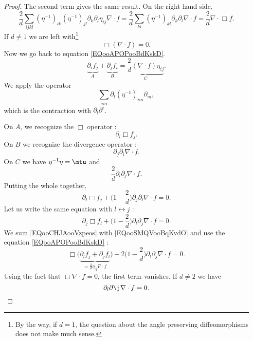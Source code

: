 \begin{proof}
    The second term gives the same result. On the right hand side,
    \begin{equation}
        \frac{ 2 }{ d }\sum_{ijkl}(\eta^{-1})_{ik}(\eta^{-1})_{jl}\partial_k\partial_l\eta_{ij}\nabla\cdot  f=\frac{ 2 }{ d }\sum_{kl}(\eta^{-1})_{kl}\partial_k\partial_l\nabla\cdot f=\frac{ 2 }{ d }\nabla\cdot\Box f.
    \end{equation}
    If \( d\neq 1\) we are left with\footnote{By the way, if \( d=1\), the question about the angle preserving diffeomorphisms does not make much sense.}
    \begin{equation}
        \Box(\nabla\cdot  f)=0.
    \end{equation}
    Now we go back to equation \eqref{EQooAPOPooBdKskD}.
    \begin{equation}
        \underbrace{\partial_i f_j}_{A}+\underbrace{\partial_j f_i}_{B}=\underbrace{\frac{ 2 }{ d }(\nabla\cdot f)\eta_{ij}}_C.
    \end{equation}
    We apply the operator
    \begin{equation}
        \sum_{im}\partial_l(\eta^{-1})_{im}\partial_m,
    \end{equation}
    which is the contraction with \( \partial_l\partial^i\).

    On \( A\), we recognize the \( \Box\) operator :
    \begin{equation}
        \partial_l\Box f_j.
    \end{equation}
    On \( B\) we recognize the divergence operator :
    \begin{equation}
        \partial_j\partial_l\nabla\cdot  f.
    \end{equation}
    On \( C\) we have \( \eta^{-1}\eta=\mtu\) and
    \begin{equation}
        \frac{ 2 }{ d }\partial_l\partial_j\nabla\cdot f.
    \end{equation}
    Putting the whole together,
    \begin{equation}    \label{EQooCHJAooVzpeos}
        \partial_l\Box f_j+\big( 1-\frac{ 2 }{ d } \big)\partial_j\partial_l\nabla\cdot f=0.
    \end{equation}
    Let us write the same equation with \( l\leftrightarrow j\) :
    \begin{equation}    \label{EQooSMQVooBqKvdO}
        \partial_j\Box f_l+\big( 1-\frac{ 2 }{ d } \big)\partial_l\partial_j\nabla\cdot f=0.
    \end{equation}
    We sum \eqref{EQooCHJAooVzpeos} with \eqref{EQooSMQVooBqKvdO}  and use the equation \eqref{EQooAPOPooBdKskD} :
    \begin{equation}
        \Box\big( \underbrace{\partial_l f_j+\partial_j f_l}_{=\frac{ 2 }{ d }\eta_{lj}\nabla\cdot f} \big)+2\big( 1-\frac{ 2 }{ d } \big)\partial_l\partial_j\nabla\cdot  f=0.
    \end{equation}
    Using the fact that \( \Box\nabla\cdot f=0\), the first term vanishes. If \( d\neq 2\) we have
    \begin{equation}
        \partial_l\partial\j\nabla\cdot  f=0.
    \end{equation}


\end{proof}
